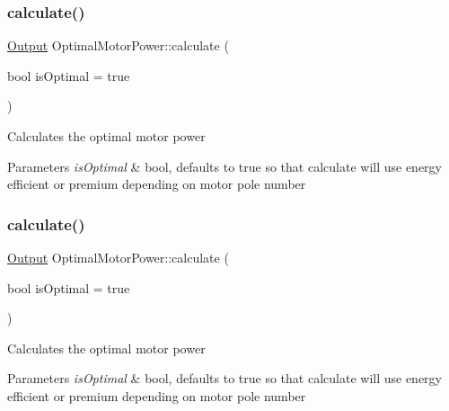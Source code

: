 \subsubsection{\texorpdfstring{calculate()}{calculate()}\hspace{0.1cm}{\footnotesize\ttfamily [2/3]}}
{\footnotesize\ttfamily \hyperlink{struct_optimal_motor_power_1_1_output}{Output} Optimal\+Motor\+Power\+::calculate (\begin{DoxyParamCaption}\item[{bool}]{is\+Optimal = {\ttfamily true} }\end{DoxyParamCaption})}

Calculates the optimal motor power 
\begin{DoxyParams}{Parameters}
{\em is\+Optimal} & bool, defaults to true so that calculate will use energy efficient or premium depending on motor pole number \\
\hline
\end{DoxyParams}
\mbox{\label{class_optimal_motor_power_a8c33958584d48ee046fcd4d56258c3e2}} 
\subsubsection{\texorpdfstring{calculate()}{calculate()}\hspace{0.1cm}{\footnotesize\ttfamily [3/3]}}
{\footnotesize\ttfamily \hyperlink{struct_optimal_motor_power_1_1_output}{Output} Optimal\+Motor\+Power\+::calculate (\begin{DoxyParamCaption}\item[{bool}]{is\+Optimal = {\ttfamily true} }\end{DoxyParamCaption})}

Calculates the optimal motor power 
\begin{DoxyParams}{Parameters}
{\em is\+Optimal} & bool, defaults to true so that calculate will use energy efficient or premium depending on motor pole number \\
\hline
\end{DoxyParams}
\mbox{\label{class_optimal_motor_power_a7d6e976abf406c54637d3b51e098d7c8}} 
